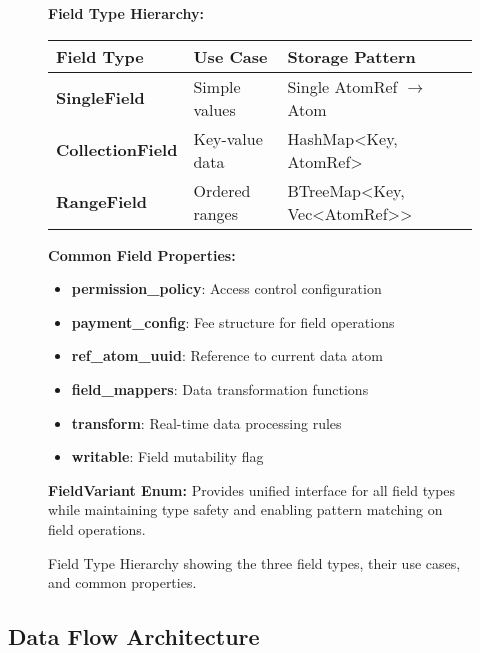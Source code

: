 \documentclass[11pt,a4paper]{article}
\begin{document}
\begin{figure}[htbp]
\centering

\textbf{Field Type Hierarchy:}

\vspace{0.5cm}

\begin{tabular}{|l|l|l|}
\hline
\textbf{Field Type} & \textbf{Use Case} & \textbf{Storage Pattern} \\
\hline
\hline
\rowcolor{retrievalcolor}
\textbf{SingleField} & Simple values & Single AtomRef $\rightarrow$ Atom \\
\hline
\rowcolor{retrievalcolor}
\textbf{CollectionField} & Key-value data & HashMap<Key, AtomRef> \\
\hline
\rowcolor{retrievalcolor}
\textbf{RangeField} & Ordered ranges & BTreeMap<Key, Vec<AtomRef>> \\
\hline
\end{tabular}

\vspace{0.5cm}

\textbf{Common Field Properties:}
\begin{itemize}
\item \textbf{permission\_policy}: Access control configuration
\item \textbf{payment\_config}: Fee structure for field operations
\item \textbf{ref\_atom\_uuid}: Reference to current data atom
\item \textbf{field\_mappers}: Data transformation functions
\item \textbf{transform}: Real-time data processing rules
\item \textbf{writable}: Field mutability flag
\end{itemize}

\vspace{0.5cm}

\textbf{FieldVariant Enum:}
Provides unified interface for all field types while maintaining type safety and enabling pattern matching on field operations.

\caption{Field Type Hierarchy showing the three field types, their use cases, and common properties.}
\label{fig:field_type_hierarchy}
\end{figure}

\subsection{Data Flow Architecture}
\end{document}

